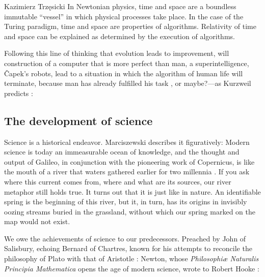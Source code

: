 \begin{artengenv}{Kazimierz Trzęsicki}
In Newtonian physics, time and space are a boundless immutable ``vessel'' in which physical processes take place. In the case of the Turing paradigm, time and space are properties of algorithms. Relativity of time and space can be explained as determined by the execution of algorithms.


Following this line of thinking that evolution leads to improvement, will construction of  a computer that is more perfect than man,  a superintelligence,  {\v C}apek's robots, lead to a situation in which the algorithm of human life will terminate, because man has already fulfilled his task \parencite{Bostrom2014}, or maybe?---as Kurzweil predicts \parencite*{Kurzweil2005}: 


\subsection{The development of science} 

Science is a historical endeavor. Marciszewski  describes it figuratively: Modern science is today an immeasurable ocean of knowledge, and the thought and output of Galileo, in conjunction with the pioneering work of Copernicus, is like the mouth of a river that  waters gathered earlier for two millennia \parencite[p.232]{MarciszewskiStacewicz2011}. If you ask where this current comes from, where and what are its sources, our river metaphor still holds true. It turns out that it is just like in nature. An identifiable spring is the beginning of this river, but it, in turn, has its origins in invisibly oozing streams buried in the grassland, without which our spring marked on the map would not exist.

We owe the achievements of science to our predecessors. Preached by John of Salisbury, echoing Bernard of Chartres, known for his attempts to reconcile the philosophy of Plato with that of Aristotle \parencites{Fairweather1956}[III. CAP IV]{Saresberiensis1159}{Saresberiensis1955}: 
Newton, whose \emph{Philosophi{\ae} Naturalis Principia Mathematica} \parencite*{Newton1687} opens the age of modern science, wrote to Robert Hooke \parencite*{Newton1675}: 



\end{artengenv}
